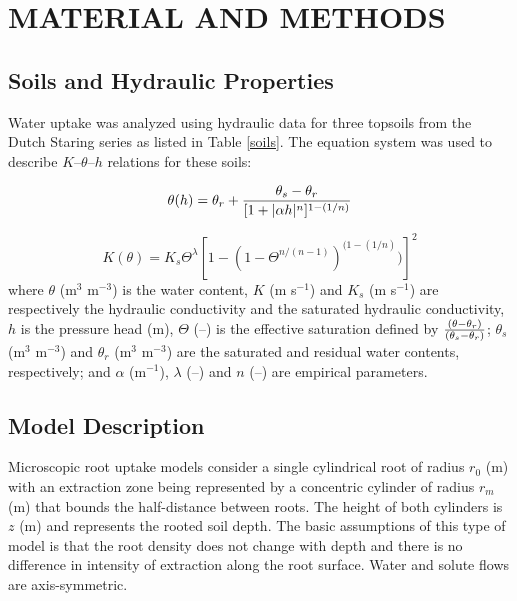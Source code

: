 \def\clim{$C_{lim}$}
\def\c2{$C_2$}
\def\uwc{(m$^3$ m$^{-3}$) }
\def\uhead{(m) }

\section*{MATERIAL AND METHODS}

\subsection*{Soils and Hydraulic Properties}

Water uptake was analyzed using hydraulic data for three topsoils from the Dutch Staring series \citep{wosten} as listed in Table \ref{soils}.
The \cite{genuchten80} equation system was used to describe $K$--$\theta$--$h$ relations for these soils:

\begin{equation}
\label{eq_theta}
\theta(h) = \theta_r + {\theta_s-\theta_r \over [1+|\alpha h|^n]^{1-(1/n)}}
\end{equation}

\begin{equation}
\label{eq_K}
K(\theta) = K_{s} \Theta^\lambda [1-(1-\Theta^{n/(n-1)})^{(1-(1/n)})]^2 
\end{equation}
%
where $\theta$ \uwc is the water content, $K$ (m s$^{-1}$) and $K_s$ (m s$^{-1}$) are respectively the hydraulic conductivity and the saturated hydraulic conductivity, $h$ is the pressure head (m), $\Theta$ (--) is the effective saturation defined by ${(\theta - \theta_r) \over (\theta_s-\theta_r)}$; $\theta_s$ \uwc and $\theta_r$ \uwc are the saturated and residual water contents, respectively; and $\alpha$ (m$^{-1}$), $\lambda$ (--) and $n$ (--) are empirical parameters.





\subsection*{Model Description}

Microscopic root uptake models consider a single cylindrical root of radius $r_0$ \uhead with an extraction zone being represented by a concentric cylinder of radius $r_m$ (m) that bounds the half-distance between roots. The height of both cylinders is $z$ \uhead and represents the rooted soil depth. 
The basic assumptions of this type of model is that the root density does not change with depth and there is no difference in intensity of extraction along the root surface. 
Water and solute flows are axis-symmetric.

